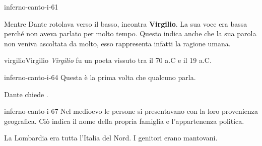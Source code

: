 \documentclass[preview]{standalone}
\begin{document}
\begin{snippet}{inferno-canto-i-61}

    Mentre Dante rotolava verso il basso, incontra \textbf{Virgilio}.
    La sua voce era bassa perché non aveva parlato per molto tempo.
    Questo indica anche che la sua parola non veniva ascoltata da molto,
    esso rappresenta infatti la ragione umana.
\end{snippet}

\begin{snippetcharacter}{virgilio}{Virgilio}
    \textit{Virgilio} fu un poeta
    vissuto tra il 70 a.C e il 19 a.C.
\end{snippetcharacter}

\begin{snippet}{inferno-canto-i-64}
    Questa è la prima volta che qualcuno parla.
    
    Dante chiede .
\end{snippet}

\begin{snippet}{inferno-canto-i-67}
    Nel medioevo le persone si presentavano con la loro provenienza geografica.
    Ciò indica il nome della propria famiglia e l'appartenenza politica.
    
    La Lombardia era tutta l'Italia del Nord.
    I genitori erano mantovani.
\end{snippet}
\end{document}
